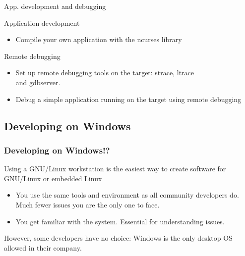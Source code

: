 \setuplabframe
{App. development and debugging}
{
  Application development
  \begin{itemize}
  \item Compile your own application with the ncurses library
  \end{itemize}
  Remote debugging
  \begin{itemize}
  \item Set up remote debugging tools on the target: strace, ltrace\\
    and gdbserver.
  \item Debug a simple application running on the target using remote
    debugging
  \end{itemize}
}

\subsection{Developing on Windows}

\begin{frame}
  \frametitle{Developing on Windows!?}
  Using a GNU/Linux workstation is the easiest way to create software
  for GNU/Linux or embedded Linux
  \begin{itemize}
  \item You use the same tools and environment as all community
    developers do.  Much fewer issues you are the only one to face.
  \item You get familiar with the system.  Essential for understanding
    issues.
  \end{itemize}
  However, some developers have no choice: Windows is the only desktop
  OS allowed in their company.
\end{frame}

